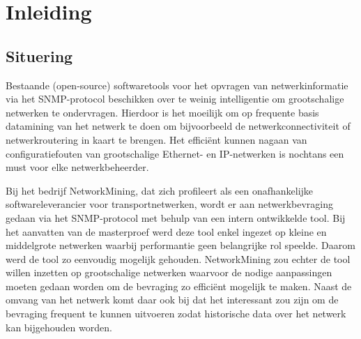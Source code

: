 

\chapter{Inleiding}


\section{Situering}
Bestaande (open-source) softwaretools voor het opvragen van netwerkinformatie via het SNMP-protocol beschikken over te weinig intelligentie om
grootschalige netwerken te ondervragen.
Hierdoor is het moeilijk om op frequente basis datamining van het netwerk te doen om bijvoorbeeld de netwerkconnectiviteit of netwerkroutering in kaart te brengen.
Het efficiënt kunnen nagaan van configuratiefouten van grootschalige Ethernet- en IP-netwerken is nochtans een must voor elke netwerkbeheerder.

Bij het bedrijf NetworkMining, dat zich profileert als een onafhankelijke softwareleverancier voor transportnetwerken,
wordt er aan netwerkbevraging gedaan via het SNMP-protocol met behulp van een intern ontwikkelde tool.
Bij het aanvatten van de masterproef werd deze tool enkel ingezet op kleine en middelgrote netwerken waarbij performantie geen belangrijke rol speelde.
Daarom werd de tool zo eenvoudig mogelijk gehouden.
NetworkMining zou echter de tool willen inzetten op grootschalige netwerken waarvoor
de nodige aanpassingen moeten gedaan worden om de bevraging zo efficiënt mogelijk te maken.
Naast de omvang van het netwerk komt daar ook bij dat het interessant zou zijn om
de bevraging frequent te kunnen uitvoeren zodat historische data over het netwerk kan bijgehouden worden.


